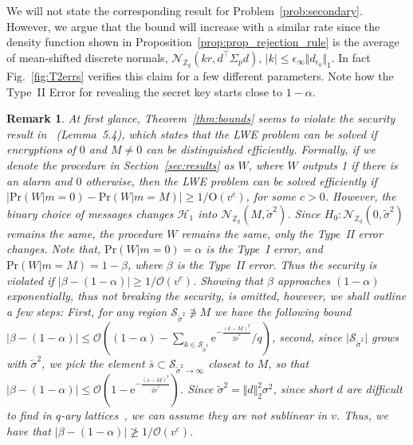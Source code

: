\documentclass[journal, twoside, web]{ieeecolorpreprint}
\newtheorem{rem}{Remark}
\begin{document}
We will not state the corresponding result for Problem~\ref{prob:secondary}. However, we argue that the bound will increase with a similar rate since the density function shown in Proposition~\ref{prop:prop_rejection_rule} is the average of mean-shifted discrete normals, $\mathcal{N}_{\mathbb{Z}_q}(kr,d^\top \Sigma_p d)$, $\vert k\vert  \leq \epsilon_\infty \Vert d_{\epsilon_0} \Vert_1$. In fact Fig.~\ref{fig:T2errs} verifies this claim for a few different parameters. Note how the Type~II Error for revealing the secret key starts close to $1-\alpha$.

\begin{rem}
    At first glance, Theorem~\ref{thm:bounds} seems to violate the security result in~\cite{regev2009} (Lemma~5.4), which states that the LWE problem can be solved if encryptions of $0$ and $M\neq 0$ can be distinguished efficiently. Formally, if we denote the procedure in Section~\ref{sec:results} as $W$, where $W$ outputs 1 if there is an alarm and $0$ otherwise, then the LWE problem can be solved efficiently if  $ \vert \mathrm{Pr}(W\vert m = 0)-\mathrm{Pr}(W \vert m = M)\vert\geq 1/\mathrm{O}(v^c)$, for some $c>0$. However, the binary choice of messages changes $\mathcal{H}_1$ into $\mathcal{N}_{\mathbb{Z}_q}(M,\tilde \sigma^2)$. Since $H_0: \mathcal{N}_{\mathbb{Z}_q}(0,\tilde\sigma^2)$ remains the same, the procedure $W$ remains the same, only the Type~II error changes. Note that, $ \mathrm{Pr}(W\vert m = 0) = \alpha$ is the Type~I error, and $\mathrm{Pr}(W \vert m = M)=1-\beta$, where $\beta$ is the Type~II error. Thus the security is violated if $\vert \beta - (1-\alpha) \vert\geq 1/\mathcal{O}(v^c)$. Showing that $\beta$ approaches $(1-\alpha)$ exponentially, thus not breaking the security, is omitted, however, we shall outline a few steps: First, for any region $\mathcal{S}_{\tilde \sigma^2} \not \ni M $ we have the following bound $\vert \beta - (1-\alpha) \vert\leq \mathcal{O} \left((1-\alpha) - \sum \limits_{k \in \mathcal{S}_{\tilde \sigma^2} } \mathrm{e}^{-\frac{(k-M)^2}{2\tilde\sigma^2}}/q \right)$, second, since $\vert \mathcal{S}_{\tilde \sigma^2} \vert $ grows with $\tilde \sigma^2$, we pick the element $\bar{ s} \subset \mathcal{S}_{\tilde \sigma^2\to \infty}$ closest to $M$, so that  $\vert \beta - (1-\alpha) \vert\leq \mathcal{O} \left( 1- \mathrm{e}^{-\frac{(\bar s-M) ^2}{2\tilde\sigma^2}} \right)$. Since $\tilde \sigma^2 = \Vert d \Vert_2^2 \sigma^2$, since short $d$ are difficult to find in $q$-ary lattices~\cite{ajtai1996}, we can assume they are not sublinear in $v$. Thus, we have that $\vert \beta - (1-\alpha) \vert \not \geq 1/\mathcal{O}(v^c)$.

\end{rem}
\end{document}
